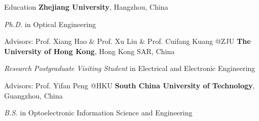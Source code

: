 \begin{rubric}{Education}
	\entry*[2018/09 -- 2023/12]%
	\textbf{Zhejiang University}, Hangzhou, China
	\par \textit{Ph.D.} in Optical Engineering
	\par Advisors: Prof. Xiang Hao \& Prof. Xu Liu \& Prof. Cuifang Kuang @ZJU
	\entry*[2022/12 -- 2023/03]%
	\textbf{The University of Hong Kong}, Hong Kong SAR, China
	\par \textit{Research Postgraduate Visiting Student} in Electrical and Electronic Engineering
	\par Advisors: Prof. Yifan Peng @HKU
	\entry*[2014/09 -- 2018/06]%
	\textbf{South China University of Technology}, Guangzhou, China
	\par \textit{B.S.} in Optoelectronic Information Science and Engineering
\end{rubric}
